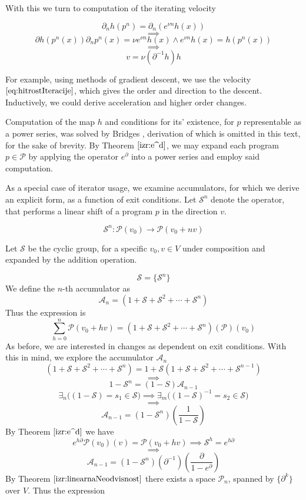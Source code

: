 \documentclass{article}
\newcommand{\Shift}{\mathcal{S}}
\newcommand{\dP}{\mathcal{P}}
\newcommand{\D}{\partial}
\begin{document}
  With this we turn to computation of the iterating velocity
 
  $$\D_nh(p^n)=\D_n(e^{\nu n}h(x))$$
  $$\implies$$
  $$\D h(p^n(x))\D_np^n(x)=\nu e^{\nu n}h(x) \land e^{\nu n}h(x)=h(p^n(x))$$
  $$\implies$$
  \begin{equation}\label{eq:hitrostIteracije}
  v=\nu(\D^{-1}h)h
  \end{equation}
  
  For example, using methods of gradient descent, we use the velocity $\eqref{eq:hitrostIteracije}$, which gives the order and direction to the descent. Inductively, we could derive acceleration and higher order changes.
  
  Computation of the map $h$ and conditions for its' existence, for $p$ representable as a power series, was solved by Bridges \cite{BridgesShroeder}, derivation of which is omitted in this text, for the sake of brevity. By Theorem $\ref{izr:e^d}$, we may expand each program $p\in\dP$ by applying the operator $e^\D$ into a power series and employ said computation.
  
  As a special case of iterator usage, we examine accumulators, for which we derive an explicit form, as a function of exit conditions. Let $\Shift^n$ denote the operator, that performs a linear shift of a program $p$ in the direction $v$.
   
   \begin{equation}
   \Shift^n:\dP(v_0)\to \dP(v_0+nv)
   \end{equation}
    
    Let $\Shift$ be the cyclic group, for a specific $v_0, v\in V$ under composition and expanded by the addition operation.
    
   $$\Shift=\{\Shift^n\}$$   
   We define the $n$-th accumulator as 
   $$\mathcal{A}_n=(1+\Shift+\Shift^2+\cdots+\Shift^n)$$ Thus the expression is
   $$\sum\limits_{h=0}^{n}\dP(v_0+hv)=(1+\Shift+\Shift^2+\cdots+\Shift^n)(\dP)(v_0)$$
   As before, we are interested in changes as dependent on exit conditions. With this in mind, we explore the accumulator $\mathcal{A}_n$
   $$(1+\Shift+\Shift^2+\cdots+\Shift^n)=1+\Shift(1+\Shift+\Shift^2+\cdots+\Shift^{n-1})$$
   $$\implies$$
   $$1-\Shift^n=(1-S)\mathcal{A}_{n-1}$$
   $$\exists_n\Big((1-\Shift)=s_1\in\Shift\Big)\implies \exists_m\Big((1-\Shift)^{-1}=s_2\in \Shift\Big)$$
   $$\implies$$
   $$\mathcal{A}_{n-1}=(1-\Shift^n)(\frac{1}{1-\Shift})$$
   By Theorem $\ref{izr:e^d}$ we have
   $$e^{h\D}\dP(v_0)(v)=\dP(v_0+hv)\implies \Shift^h=e^{h\D}$$
   $$\implies$$
   $$\mathcal{A}_{n-1}=(1-\Shift^n)(\D^{-1})(\frac{\D}{1-e^{\D}})$$
   By Theorem $\ref{izr:linearnaNeodvisnost}$  there exists a space $\dP_n$, spanned by $\{\D^k\}$ over $V$. Thus the expression   
     
\end{document}
